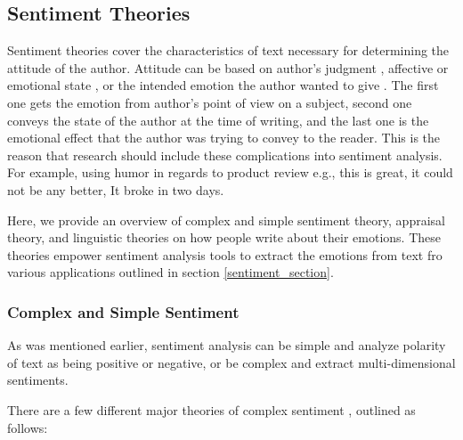 \documentclass[11pt,a4paper]{article}
\begin{document}
\subsection{Sentiment Theories}
Sentiment theories cover the characteristics of text necessary for determining the attitude of the author. Attitude can be based on author's judgment \cite{whitelaw}, affective or emotional state \cite{osgood}, or the intended emotion the author wanted to give \cite{hovy}. The first one gets the emotion from author's point of view on a subject, second one conveys the state of the author at the time of writing, and the last one is the emotional effect that the author was trying to convey to the reader. This is the reason that research should include these complications into sentiment analysis. For example, using humor in regards to product review e.g., this is great, it could not be any better, It broke in two days. 

Here, we provide an overview of complex and simple sentiment theory, appraisal theory, and linguistic theories on how people write about their emotions. These theories empower sentiment analysis tools to extract the emotions from text fro various applications outlined in section \ref{sentiment_section}.

\subsubsection{Complex and Simple Sentiment}
As was mentioned earlier, sentiment analysis can be simple and analyze polarity of text as being positive or negative, or be complex and extract multi-dimensional sentiments.

There are a few different major theories of complex sentiment \cite{sarah}, outlined as follows:
\end{document}
